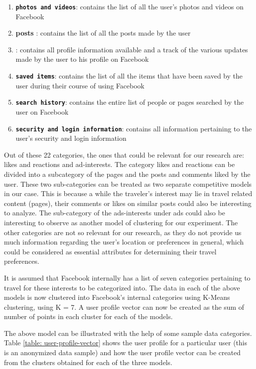 \begin{enumerate}[i]
   \item \textbf{\texttt{photos and videos}}: contains the list of all the user's photos and videos on Facebook
   \item \textbf{posts} : contains the list of all the posts made by the user
   \item \textbf{}: contains all profile information available and a track of the various updates made by the user to his profile on Facebook
   \item \textbf{\texttt{saved items}}: contains the list of all the items that have been saved by the user during their course of using Facebook
   \item \textbf{\texttt{search history}}: contains the entire list of people or pages searched by the user on Facebook
   \item \textbf{\texttt{security and login information}}: contains all information pertaining to the user's security and login information
  
\end{enumerate}

Out of these 22 categories, the ones that could be relevant for our research are: likes and reactions and  ad-interests. 
The category likes and reactions can be divided into a subcategory of the pages and the posts and comments liked by the user. These two sub-categories can be treated as two separate competitive models in our case. This is because a while the traveler's interest may lie in travel related content (pages), their comments or likes on similar posts could also be interesting to analyze. The sub-category of the ads-interests under ads could also be interesting to observe as another model of clustering for our experiment. The other categories are not so relevant for our research, as they do not provide us much information regarding the user's location or preferences in general, which could be considered as essential attributes for determining their travel preferences. 

It is assumed that Facebook internally has a list of seven categories pertaining to travel for these interests to be categorized into. The data in each of the above models is now clustered into Facebook's internal categories using K-Means clustering, using K = 7. A user profile vector can now be created as the sum of number of points in each cluster for each of the models. 


The above model can be illustrated with the help of some sample data categories. Table \ref{table: user-profile-vector} shows the user profile for a particular user (this is an anonymized data sample) and how the user profile vector can be created from the clusters obtained for each of the three models.

